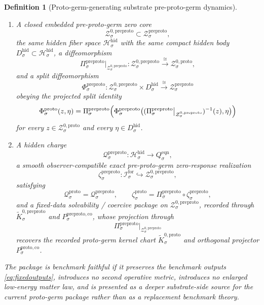\documentclass[11pt]{article}
\newcommand{\ForSpace}[1]{\mathcal I_{#1}^{\mathrm{for}}}
\newcommand{\SubPair}[1]{\mathfrak s_{#1}^{\mathrm{sub}}}
\newcommand{\EqnTarget}[1]{Q_{#1}^{\mathrm{eqn}}}
\newcommand{\HiddenSpace}[1]{\mathcal H_{#1}^{\mathrm{hid}}}
\newcommand{\HiddenBody}[1]{D_{#1}^{\mathrm{hid}}}
\newcommand{\ProtoSection}[1]{\Gamma_{#1}^{\mathrm{proto}}}
\newcommand{\ProtoShellSet}[1]{\mathcal Z_{#1}^{\mathrm{proto}}}
\newcommand{\ProtoZeroCore}[1]{\mathcal Z_{#1}^{0,\mathrm{proto}}}
\newcommand{\ProtoSplit}[1]{\Phi_{#1}^{\mathrm{proto}}}
\newcommand{\ProtoCharge}[1]{\mathcal Q_{#1}^{\mathrm{proto}}}
\newcommand{\ProtoEmbed}[1]{\zeta_{#1}^{\mathrm{proto}}}
\newcommand{\ProtoKernelCh}[1]{\widetilde K_{#1}^{0,\mathrm{proto}}}
\newcommand{\ProtoStateComp}[1]{P_{#1}^{\mathrm{proto,co}}}
\newcommand{\PreProtoBody}[1]{\mathcal B_{#1}^{\mathrm{preproto}}}
\newcommand{\PreProtoProj}[1]{\Pi_{#1}^{\mathrm{preproto}}}
\newcommand{\PreProtoProtoMin}[1]{\mathfrak f_{#1}^{\mathrm{preproto,proto}}}
\newcommand{\PreProtoSection}[1]{\Gamma_{#1}^{\mathrm{preproto}}}
\newcommand{\PreProtoShellSet}[1]{\mathcal Z_{#1}^{\mathrm{preproto}}}
\newcommand{\PreProtoZeroCore}[1]{\mathcal Z_{#1}^{0,\mathrm{preproto}}}
\newcommand{\PreProtoSplit}[1]{\Phi_{#1}^{\mathrm{preproto}}}
\newcommand{\PreProtoCharge}[1]{\mathcal Q_{#1}^{\mathrm{preproto}}}
\newcommand{\PreProtoEmbed}[1]{\zeta_{#1}^{\mathrm{preproto}}}
\newcommand{\PreProtoKernelCh}[1]{\widetilde K_{#1}^{0,\mathrm{preproto}}}
\newcommand{\PreProtoStateComp}[1]{P_{#1}^{\mathrm{preproto,co}}}
\newtheorem{definition}{Definition}
\begin{document}
\begin{definition}[Proto-germ-generating substrate pre-proto-germ dynamics]
\begin{enumerate}
\[    \equiv
    \SubPair{\sigma}\bigl(\PreProtoSection{\sigma}(q),\PreProtoSection{\sigma}(q)\bigr),
    \]
    and the exact pre-proto-germ shell
    \[
    \PreProtoShellSet{\sigma}
    \equiv
    \bigl(\PreProtoSection{\sigma}\bigr)^{-1}(0)\cap\PreProtoBody{\sigma},
    \]
    satisfying
    \[
    \PreProtoSection{\sigma}\circ\PreProtoProtoMin{\sigma}
    =
    \ProtoSection{\sigma},
    \qquad
    \PreProtoProj{\sigma}\big|_{\PreProtoShellSet{\sigma}}
    :
    \PreProtoShellSet{\sigma}
    \xrightarrow{\cong}
    \ProtoShellSet{\sigma}.
    \]
    \item A closed embedded pre-proto-germ zero core
    \[
    \PreProtoZeroCore{\sigma}\subset\PreProtoShellSet{\sigma},
    \]
    the same hidden fiber space \(\HiddenSpace{\sigma}\) with the same compact hidden body \(\HiddenBody{\sigma}\subset\HiddenSpace{\sigma}\), a diffeomorphism
    \[
    \PreProtoProj{\sigma}\big|_{\PreProtoZeroCore{\sigma}}
    :
    \PreProtoZeroCore{\sigma}
    \xrightarrow{\cong}
    \ProtoZeroCore{\sigma},
    \]
    and a split diffeomorphism
    \[
    \PreProtoSplit{\sigma}:
    \PreProtoZeroCore{\sigma}\times\HiddenBody{\sigma}
    \xrightarrow{\cong}
    \PreProtoShellSet{\sigma}
    \]
    obeying the projected split identity
    \[
    \ProtoSplit{\sigma}(z,\eta)
    =
    \PreProtoProj{\sigma}\Bigl(
    \PreProtoSplit{\sigma}\bigl(
    (\PreProtoProj{\sigma}\big|_{\PreProtoZeroCore{\sigma}})^{-1}(z),\eta
    \bigr)\Bigr)
    \]
    for every \(z\in\ProtoZeroCore{\sigma}\) and every \(\eta\in\HiddenBody{\sigma}\).
    \item A hidden charge
    \[
    \PreProtoCharge{\sigma}:\HiddenSpace{\sigma}\to\EqnTarget{\sigma},
    \]
    a smooth observer-compatible exact pre-proto-germ zero-response realization
    \[
    \PreProtoEmbed{\sigma}:\ForSpace{\sigma}\hookrightarrow\PreProtoZeroCore{\sigma},
    \]
    satisfying
    \[
    \ProtoCharge{\sigma}
    =
    \PreProtoCharge{\sigma},
    \qquad
    \ProtoEmbed{\sigma}
    =
    \PreProtoProj{\sigma}\circ\PreProtoEmbed{\sigma},
    \]
    and a fixed-data solvability / coercive package on \(\PreProtoZeroCore{\sigma}\), recorded through \(\PreProtoKernelCh{\sigma}\) and \(\PreProtoStateComp{\sigma}\), whose projection through
    \[
    \PreProtoProj{\sigma}\big|_{\PreProtoZeroCore{\sigma}}
    \]
    recovers the recorded proto-germ kernel chart \(\ProtoKernelCh{\sigma}\) and orthogonal projector \(\ProtoStateComp{\sigma}\).
\end{enumerate}
The package is \emph{benchmark faithful} if it preserves the benchmark outputs \eqref{eq:fixedoutputs}, introduces no second operative metric, introduces no enlarged low-energy matter law, and is presented as a deeper substrate-side source for the current proto-germ package rather than as a replacement benchmark theory.
\end{definition}
\end{document}
